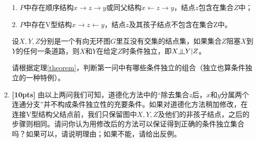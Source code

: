 \documentclass[a4paper,UTF8]{article}
\numberwithin{equation}{section}
\newcommand{\indep}{\rotatebox[origin=c]{90}{$\models$}}
\begin{document}
\begin{enumerate}[(1)]
\begin{def-box}[阻塞]
		1. $P$中存在顺序结构$x\rightarrow z\rightarrow y$或同父结构$x\leftarrow z\rightarrow y$，结点$z$包含在集合$Z$中；
		
		2. $P$中存在V型结构$x\rightarrow z \leftarrow y$，结点$z$及其孩子结点不包含在集合Z中。
		
	\end{def-box}
	\begin{theorem}[条件独立]
		\label{theorem}
		设$X,Y,Z$分别是一个有向无环图$G$里互没有交集的结点集，如果集合$Z$阻塞$X$到$Y$的任何一条道路，则$X$和$Y$在给定$Z$时条件独立，即$X\indep Y|Z$。
	\end{theorem}
	请根据定理\ref{theorem}，判断第一问中有哪些条件独立的组合（独立也算条件独立的一种特例）。
	
	\item \textbf{[10pts]} 由以上两问我们可知，道德化方法中的“除去集合$z$后，$x$和$y$分属两个连通分支”并不构成条件独立性的充要条件。如果对道德化方法稍加修改，在连接V型结构父结点前，我们只保留图中$X,Y,Z$及他们的非孩子结点，之后的步骤则相同。请问你认为用修改后的方法可以保证得到{\color{red}{全部的}}正确的条件独立集合吗？如果可以，请说明理由；如果不能，请给出反例。
	
\end{enumerate}
\end{document}

